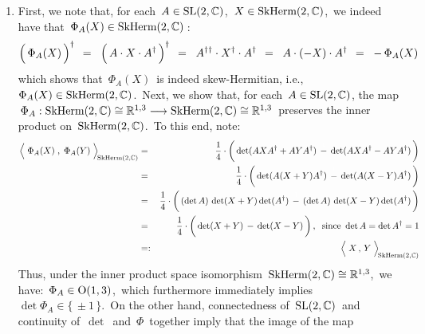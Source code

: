 \begin{enumerate}
\item
	First, we note that, for each \,$A \in \textnormal{SL}(2,\mathbb{C})$,\, $X \in \textnormal{SkHerm}(2,\mathbb{C})$,\,
	we indeed have that \,$\Phi_{A}(X) \in \textnormal{SkHerm}(2,\mathbb{C})$\,:
	\begin{eqnarray*}
	\left(\,\Phi_{A}(\overset{{\color{white}.}}{X})\,\right)^{\dagger}
	\;\, = \;\;
		\left(\, A \cdot \overset{{\color{white}.}}{X} \cdot A^{\dagger} \,\right)^{\dagger}
	\;\, = \;\;
		A^{\dagger\dagger} \cdot X^{\dagger} \cdot A^{\dagger}
	\;\, = \;\;
		A \cdot (-X) \cdot A^{\dagger}
	\;\, = \;\;
		- \, \Phi_{A}(X)
	\end{eqnarray*}
	which shows that \,$\Phi_{A}(X)$\, is indeed skew-Hermitian, i.e.,
	\,$\Phi_{A}(X) \in \textnormal{SkHerm}(2,\mathbb{C})$.\,
	Next, we show that, for each \,$A \in \textnormal{SL}(2,\mathbb{C})$, the map
	\,$\Phi_{A} : \textnormal{SkHerm}(2,\mathbb{C}) \cong \mathbb{R}^{1,3} \longrightarrow \textnormal{SkHerm}(2,\mathbb{C}) \cong \mathbb{R}^{1,3}$\,
	preserves the inner product on \,$\textnormal{SkHerm}(2,\mathbb{C})$.\,
	To this end, note:
	\begin{eqnarray*}
	\left\langle\;
		\Phi_{A}(\overset{{\color{white}.}}{X})
		\; , \;
		\Phi_{A}(Y)
		\;\right\rangle_{\!\textnormal{SkHerm}(2,\C)}
	& = &
		\dfrac{1}{4}\cdot\left(\,
			\det(AXA^{\dagger} + AYA^{\dagger})
			\, \overset{{\color{white}1}}{-} \,
			\det(AXA^{\dagger} - AYA^{\dagger})
			\,\right)
	\\
	& = &
		\dfrac{1}{4}\cdot\left(\,
			\det(A(X + Y)A^{\dagger})
			\, \overset{{\color{white}1}}{-} \,
			\det(A(X - Y)A^{\dagger})
			\,\right)
	\\
	& = &
		\dfrac{1}{4}\cdot\left(\,
			(\det A)\,\det(X + Y)\det(A^{\dagger})
			\, \overset{{\color{white}1}}{-} \,
			(\det A)\,\det(X - Y)\det(A^{\dagger})
			\,\right)
	\\
	& = &
		\dfrac{1}{4}\cdot\left(\,
			\det(X + Y)
			\, \overset{{\color{white}1}}{-} \,
			\det(X - Y)
			\,\right),
		\;\;
		\textnormal{since \,$\det A = \det A^{\dagger} = 1$}
	\\
	& =: &
		\left\langle\;
			\overset{{\color{white}.}}{X}
			\, , \,
			Y
			\;\right\rangle_{\!\textnormal{SkHerm}(2,\C)}
	\end{eqnarray*}
	Thus, under the inner product space isomorphism
	\,$\textnormal{SkHerm}(2,\mathbb{C}) \cong \mathbb{R}^{1,3}$,\,
	we have:
	\,$\Phi_{A} \in \textnormal{O}(1,3)$,\,
	which furthermore immediately implies
	\,$\det\Phi_{A} \in \{\,\pm 1\,\}$.\,
	On the other hand, connectedness of \,$\textnormal{SL}(2,\mathbb{C})$\, and continuity of
	\,$\det$\, and \,$\Phi$\, together imply that the image of the map

\end{enumerate}
